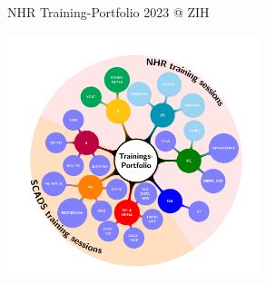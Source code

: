 \documentclass[compress,aspectratio=169]{beamer}
\begin{document}
{
\begin{frame}{NHR Training-Portfolio 2023 @ ZIH}
\vspace{-0.3cm}
\begin{center}
 \includegraphics[width=0.55\textwidth]{mindmap_23_plot_nhr_scads_20230503.pdf} 
\end{center}

\end{frame}
}
\end{document}
